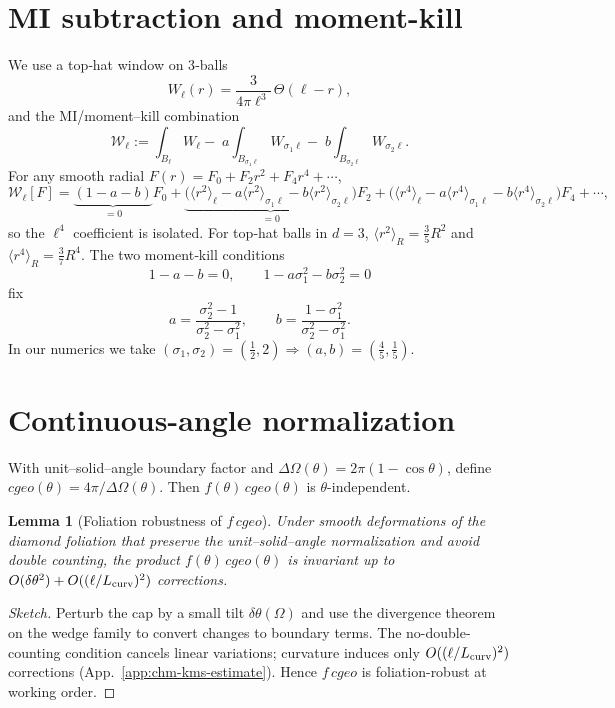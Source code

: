 \documentclass[aps,prd,onecolumn,superscriptaddress,nofootinbib]{revtex4-2}
\def\cgeo{cgeo}%
\def\Omega_\Lambda{OmegaLambda}%
\providecommand{\cgeo}{c_{\rm geo}}
\newtheorem{lemma}{Lemma}
\begin{document}
\section{MI subtraction and moment-kill}
\label{app:MI}
We use a top‑hat window on 3‑balls
\[
W_\ell(r)=\frac{3}{4\pi \ell^3}\,\Theta(\ell-r),
\]
and the MI/moment–kill combination
\[
\mathcal{W}_\ell:=\int_{B_\ell}\!W_\ell-\;a\!\int_{B_{\sigma_1\ell}}\!W_{\sigma_1\ell}-\;b\!\int_{B_{\sigma_2\ell}}\!W_{\sigma_2\ell}.
\]
For any smooth radial \(F(r)=F_0+F_2 r^2+F_4 r^4+\cdots\),
\[
\mathcal{W}_\ell[F]=\underbrace{(1-a-b)}_{=0}F_0+\underbrace{\Big(\langle r^2\rangle_\ell-a\langle r^2\rangle_{\sigma_1\ell}-b\langle r^2\rangle_{\sigma_2\ell}\Big)}_{=0}F_2+\Big(\langle r^4\rangle_\ell-a\langle r^4\rangle_{\sigma_1\ell}-b\langle r^4\rangle_{\sigma_2\ell}\Big)F_4+\cdots,
\]
so the \(\ell^4\) coefficient is isolated. For top‑hat balls in \(d{=}3\), \(\langle r^2\rangle_{R}=\tfrac{3}{5}R^2\) and \(\langle r^4\rangle_{R}=\tfrac{3}{7}R^4\). The two moment‑kill conditions
\[
1-a-b=0,\qquad 1-a\sigma_1^2-b\sigma_2^2=0
\]
fix
\[
a=\frac{\sigma_2^2-1}{\sigma_2^2-\sigma_1^2},\qquad b=\frac{1-\sigma_1^2}{\sigma_2^2-\sigma_1^2}.
\]
In our numerics we take \((\sigma_1,\sigma_2)=(\tfrac12,2)\Rightarrow (a,b)=(\tfrac45,\tfrac15)\).

\section{Continuous-angle normalization}
\label{app:angle}
With unit–solid–angle boundary factor and \(\Delta\Omega(\theta)=2\pi(1-\cos\theta)\), define \(\cgeo(\theta)=4\pi/\Delta\Omega(\theta)\). Then \(f(\theta)\,\cgeo(\theta)\) is \(\theta\)-independent.

\begin{lemma}[Foliation robustness of $f\,\cgeo$]
Under smooth deformations of the diamond foliation that preserve the unit–solid–angle normalization and avoid double counting, the product $f(\theta)\,\cgeo(\theta)$ is invariant up to $O(\delta\theta^2)+O((\ell/L_{\rm curv})^2)$ corrections.
\end{lemma}
\begin{proof}[Sketch]
Perturb the cap by a small tilt $\delta\theta(\Omega)$ and use the divergence theorem on the wedge family to convert changes to boundary terms. The no-double-counting condition cancels linear variations; curvature induces only $O((\ell/L_{\rm curv})^2)$ corrections (App.~\ref{app:chm-kms-estimate}). Hence $f\,\cgeo$ is foliation-robust at working order.
\end{proof}
\end{document}
